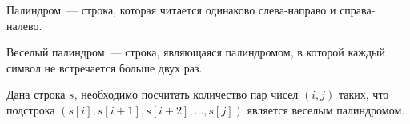 Палиндром~--- строка, которая читается одинаково слева-направо и справа-налево.

Веселый палиндром~--- строка, являющаяся палиндромом, в которой каждый символ не встречается больше двух раз.

Дана строка $s$, необходимо посчитать количество пар чисел $(i, j)$ таких, что подстрока $(s[i], s[i + 1], s[i + 2], ..., s[j])$ является веселым палиндромом.